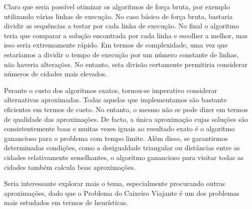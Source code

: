 \documentclass[12pt,a4paper,reqno]{report}
\numberwithin{equation}{section}
\begin{document}
Claro que seria possível otimizar os algoritmos de força bruta, por exemplo utilizando várias linhas de execução. No caso básico de força bruta, bastaria dividir as sequências a testar por cada linha de execução. No final o algoritmo teria que comparar a solução encontrada por cada linha e escolher a melhor, mas isso seria extremamente rápido. Em termos de complexidade, uma vez que estaríamos a dividir o tempo de execução por um número constante de linhas, não haveria alterações. No entanto, esta divisão certamente permitiria considerar números de cidades mais elevados.

Perante o custo dos algoritmos exatos, tornou-se imperativo considerar alternativas aproximadas. Todas aquelas que implementamos são bastante eficientes em termos de custo. No entanto, o mesmo não se pode dizer em termos de qualidade das aproximações. De facto, a única aproximação cujas soluções são consistentemente boas e muitas vezes iguais ao resultado exato é o algoritmo ganancioso para o problema com tempo limite. Além disso, se garantirmos determinadas condições, como a desigualdade triangular ou distâncias entre as cidades relativamente semelhantes, o algoritmo ganancioso para visitar todas as cidades também calcula boas aproximações.

Seria interessante explorar mais o tema, especialmente procurando outras aproximações, dado que o Problema do Caixeiro Viajante é um dos problemas mais estudados em termos de heurísticas.



\end{document}
